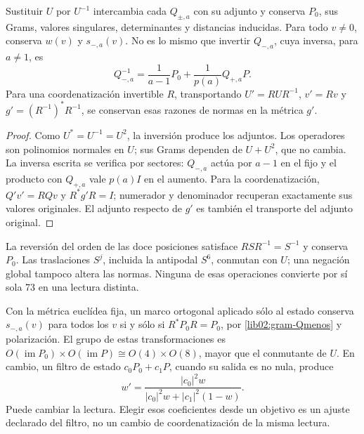 \begin{proposition}
\label{lib02:inversion-carta}
Sustituir \(U\) por \(U^{-1}\) intercambia cada \(Q_{\pm,a}\)
con su adjunto y conserva \(P_0\), sus Grams, valores singulares,
determinantes y distancias inducidas. Para todo \(v\ne0\), conserva
\(w(v)\) y \(s_{-,a}(v)\). No es lo mismo que invertir
\(Q_{-,a}\), cuya inversa, para \(a\ne1\), es
\begin{equation}
 Q_{-,a}^{-1}
 =\frac1{a-1}P_0+\frac1{p(a)}Q_{+,a}P.
 \label{lib02:inversa-Q}
\end{equation}
Para una coordenatización invertible \(R\), transportando
\(U'=RUR^{-1}\), \(v'=Rv\) y
\(g'=(R^{-1})^*R^{-1}\), se conservan esas razones de normas en
la métrica \(g'\).
\end{proposition}
\begin{proof}
Como \(U^*=U^{-1}=U^2\), la inversión produce los adjuntos.
Los operadores son polinomios normales en \(U\); sus Grams dependen
de \(U+U^2\), que no cambia. La inversa escrita se verifica por
sectores: \(Q_{-,a}\) actúa por \(a-1\) en el fijo y el producto
con \(Q_{+,a}\) vale \(p(a)I\) en el aumento. Para la coordenatización,
\(Q'v'=RQv\) y \(R^*g'R=I\); numerador y denominador recuperan
exactamente sus valores originales. El adjunto respecto de \(g'\)
es también el transporte del adjunto original.
\end{proof}

La reversión del orden de las doce posiciones satisface
\(RSR^{-1}=S^{-1}\) y conserva \(P_0\). Las traslaciones \(S^j\),
incluida la antipodal \(S^6\), conmutan con \(U\); una negación
global tampoco altera las normas. Ninguna de esas operaciones convierte
por sí sola 73 en una lectura distinta.

Con la métrica euclídea fija, un marco ortogonal aplicado sólo al estado
conserva \(s_{-,a}(v)\) para todos los \(v\) si y sólo si
\(R^*P_0R=P_0\), por \eqref{lib02:gram-Qmenos} y polarización.
El grupo de estas transformaciones es
\(O(\operatorname{im}P_0)\times O(\operatorname{im}P)
\cong O(4)\times O(8)\), mayor que el conmutante de \(U\).
En cambio, un filtro de estado
\(c_0P_0+c_1P\), cuando su salida es no nula, produce
\begin{equation}
 w'=
 \frac{|c_0|^2w}{|c_0|^2w+|c_1|^2(1-w)}.
 \label{lib02:filtro-pesos}
\end{equation}
Puede cambiar la lectura. Elegir esos coeficientes desde un objetivo es
un ajuste declarado del filtro, no un cambio de coordenatización de la misma
lectura.

